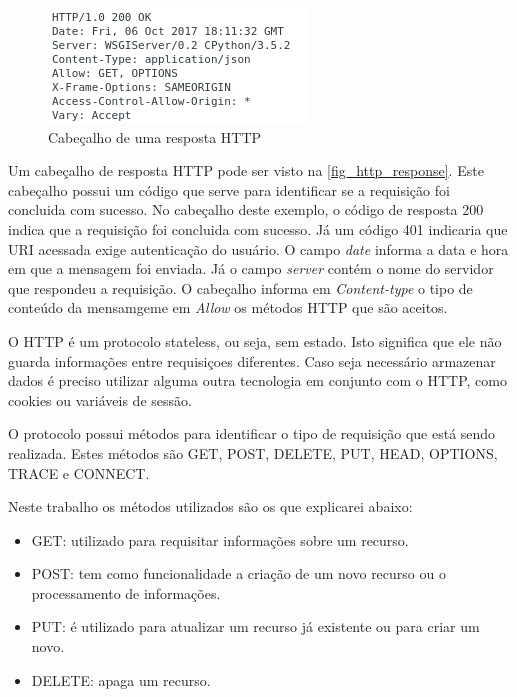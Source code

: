 \documentclass[
	12pt,				%
	openright,			%
	oneside,			%
	a4paper,			%
	english,			%
	french,				%
	spanish,			%
	brazil				%
	]{abntex2}
\begin{document}
\begin{figure}[htb]
	\caption{\label{fig_http_response} Cabeçalho de uma resposta HTTP}
	\begin{center}
		\includegraphics[scale=0.7]{http_response.png}
	\end{center}
\end{figure}

Um cabeçalho de resposta HTTP pode ser visto na \autoref{fig_http_response}. Este cabeçalho possui um código que serve para identificar se a requisição foi concluida com sucesso. No cabeçalho deste exemplo, o código de resposta 200 indica que a requisição foi concluida com sucesso. Já um código 401 indicaria que URI acessada exige autenticação do usuário. O campo \textit{date} informa a data e hora em que a mensagem foi enviada. Já o campo \textit{server} contém o nome do servidor que respondeu a requisição. O cabeçalho informa em \textit{Content-type} o tipo de conteúdo da mensamgeme em \textit{Allow} os métodos HTTP que são aceitos.

O HTTP é um protocolo stateless, ou seja, sem estado. Isto significa que ele não guarda informações entre requisiçoes diferentes. Caso seja necessário armazenar dados é preciso utilizar alguma outra tecnologia em conjunto com o HTTP, como cookies ou variáveis de sessão.

O protocolo possui métodos para identificar o tipo de requisição que está sendo realizada. Estes métodos são GET, POST, DELETE, PUT, HEAD, OPTIONS, TRACE e CONNECT. 

Neste trabalho os métodos utilizados são os que explicarei abaixo:

\begin{itemize}
	\item GET: utilizado para requisitar informações sobre um recurso.
	\item POST: tem como funcionalidade a criação de um novo recurso ou o processamento de informações. 
	\item PUT: é utilizado para atualizar um recurso já existente ou para criar um novo.
	\item DELETE: apaga um recurso.     
\end{itemize} 
\end{document}
